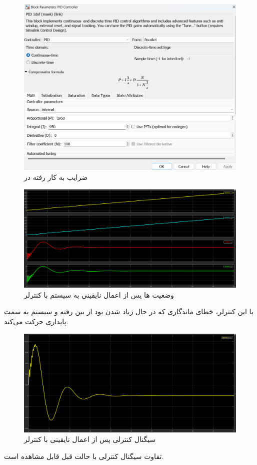 \documentclass[14pt, a4paper]{extarticle}
\begin{document}
\begin{figure}[h!]
	\centering
	\includegraphics[scale = 0.5]{Q2_4_2_pid.png}
	\caption{ضرایب 
		به کار رفته در 
		}
\end{figure}


\newpage
\begin{figure}[h!]
	\centering
	\includegraphics[scale = 0.4]{Q2_4_2_states.png}
	\caption{وضعیت 
		ها پس از اعمال نایقینی به سیستم با کنترلر 
		}
\end{figure}

با این کنترلر، خطای ماندگاری که در حال زیاد شدن بود از بین رفته و سیستم به سمت پایداری حرکت می‌کند.


\begin{figure}[h!]
	\centering
	\includegraphics[scale = 0.4]{Q2_4_2_control.png}
	\caption{سیگنال کنترلی پس از اعمال نایقینی با کنترلر 
		}
\end{figure}

تفاوت سیگنال کنترلی با حالت قبل قابل مشاهده است.
\end{document}

